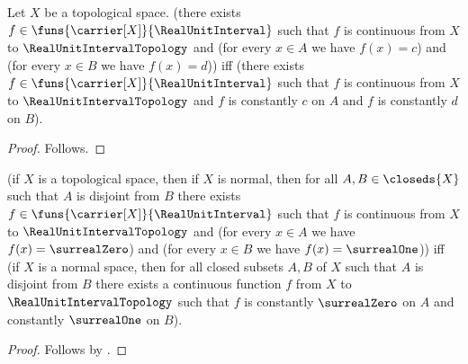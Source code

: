 



\begin{proposition}\label{readability_interval_map_assertion_equivalence}
    Let $X$ be a topological space.
    (there exists $f\in\funs{\carrier[X]}{\RealUnitInterval}$ such that
        $f$ is continuous from $X$ to $\RealUnitIntervalTopology$ and
        (for every $x\in A$ we have $f(x)=c$) and
        (for every $x\in B$ we have $f(x)=d$))
    iff
    (there exists $f\in\funs{\carrier[X]}{\RealUnitInterval}$ such that
        $f$ is continuous from $X$ to $\RealUnitIntervalTopology$ and
        $f$ is constantly $c$ on $A$ and $f$ is constantly $d$ on $B$).
\end{proposition}
\begin{proof}
    Follows.
\end{proof}

\begin{proposition}\label{readability_urysohn_statement_equivalence}
    (if $X$ is a topological space, then if $X$ is normal, then
        for all $A,B\in\closeds{X}$ such that $A$ is disjoint from $B$
        there exists $f\in\funs{\carrier[X]}{\RealUnitInterval}$ such that
            $f$ is continuous from $X$ to $\RealUnitIntervalTopology$ and
            (for every $x\in A$ we have $f(x)=\surrealZero$) and
            (for every $x\in B$ we have $f(x)=\surrealOne$))
    iff
    (if $X$ is a normal space, then
        for all closed subsets $A,B$ of $X$ such that $A$ is disjoint from $B$
        there exists a continuous function $f$ from $X$ to
            $\RealUnitIntervalTopology$ such that
            $f$ is constantly $\surrealZero$ on $A$ and
            constantly $\surrealOne$ on $B$).
\end{proposition}
\begin{proof}
    Follows by .
\end{proof}
